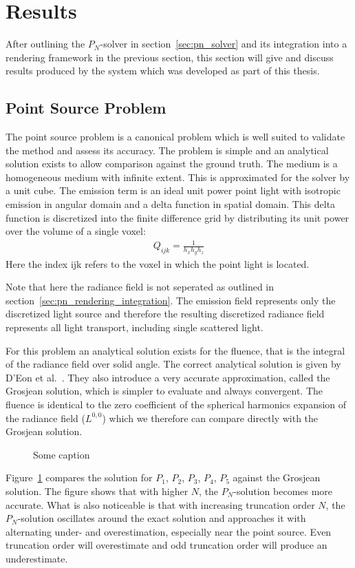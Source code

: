 \section{Results}
\label{sec:pn_results}

After outlining the $P_N$-solver in section~\ref{sec:pn_solver} and its integration into a rendering framework in the previous section, this section will give and discuss results produced by the system which was developed as part of this thesis.

\subsection{Point Source Problem}
\label{sec:pn_results_pointsource}

The point source problem is a canonical problem which is well suited to validate the method and assess its accuracy. The problem is simple and an analytical solution exists to allow comparison against the ground truth. The medium is a homogeneous medium with infinite extent. This is approximated for the solver by a unit cube. The emission term is an ideal unit power point light with isotropic emission in angular domain and a delta function in spatial domain. This delta function is discretized into the finite difference grid by distributing its unit power over the volume of a single voxel:
\begin{align}
Q_{ijk} = \frac{1}{h_xh_yh_z}
\end{align}
Here the index {ijk} refers to the voxel in which the point light is located.

Note that here the radiance field is not seperated as outlined in section~\ref{sec:pn_rendering_integration}. The emission field represents only the discretized light source and therefore the resulting discretized radiance field represents all light transport, including single scattered light.

For this problem an analytical solution exists for the fluence, that is the integral of the radiance field over solid angle. The correct analytical solution is given by D'Eon et al.~\cite{dEon11}. They also introduce a very accurate approximation, called the Grosjean solution, which is simpler to evaluate and always convergent. The fluence is identical to the zero coefficient of the spherical harmonics expansion of the radiance field ($L^{0,0}$) which we therefore can compare directly with the Grosjean solution.
\begin{figure}[h]
\centering
{}
\caption{Some caption}
\label{fig:pn_results_pointsource_1}
\end{figure}
Figure~\ref{fig:pn_results_pointsource_1} compares the solution for $P_1$, $P_2$, $P_3$, $P_4$, $P_5$ against the Grosjean solution. The figure shows that with higher $N$, the $P_N$-solution becomes more accurate. What is also noticeable is that with increasing truncation order $N$, the $P_N$-solution oscillates around the exact solution and approaches it with alternating under- and overestimation, especially near the point source. Even truncation order will overestimate and odd truncation order will produce an underestimate. 

